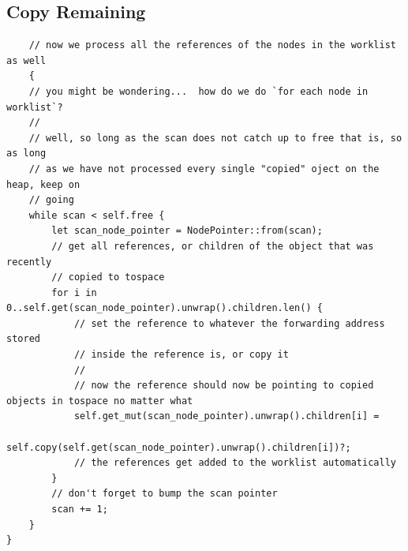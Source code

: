 \documentclass[index]{subfiles}
\begin{document}
\subsection{Copy Remaining}
\begin{verbatim}
    // now we process all the references of the nodes in the worklist as well
    {
    // you might be wondering...  how do we do `for each node in worklist`?
    // 
    // well, so long as the scan does not catch up to free that is, so as long
    // as we have not processed every single "copied" oject on the heap, keep on
    // going
    while scan < self.free {
        let scan_node_pointer = NodePointer::from(scan);
        // get all references, or children of the object that was recently
        // copied to tospace
        for i in 0..self.get(scan_node_pointer).unwrap().children.len() {
            // set the reference to whatever the forwarding address stored
            // inside the reference is, or copy it
            // 
            // now the reference should now be pointing to copied objects in tospace no matter what
            self.get_mut(scan_node_pointer).unwrap().children[i] =
                self.copy(self.get(scan_node_pointer).unwrap().children[i])?;
            // the references get added to the worklist automatically
        }
        // don't forget to bump the scan pointer
        scan += 1;
    }
}
\end{verbatim}
\end{document}
